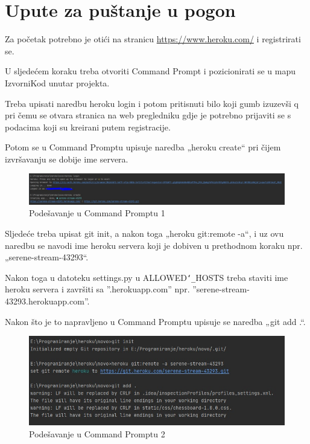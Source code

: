 			\eject
		
		\section{Upute za puštanje u pogon}
		
			\noindent Za početak potrebno je otići na stranicu \url{https://www.heroku.com/} i registrirati se. 
			
			\noindent U sljedećem koraku treba otvoriti Command Prompt i pozicionirati se u mapu IzvorniKod unutar projekta.
			
			\noindent Treba upisati naredbu heroku login i potom pritisnuti bilo koji gumb izuzevši q pri čemu se otvara stranica na web pregledniku gdje je potrebno prijaviti se s podacima koji su kreirani putem registracije.
			
			\noindent Potom se u Command Promptu upisuje naredba „heroku create“ pri čijem izvršavanju se dobije ime servera.
			
			\begin{figure}[H]
				\centerfloat
				\includegraphics[scale=0.3]{slike/pustanjeupogon1.jpeg} %
				\caption{Podešavanje u Command Promptu 1}
				
			\end{figure}
			
			\noindent Sljedeće treba upisat git init, a nakon toga „heroku git:remote -a“, i uz ovu naredbu se navodi ime heroku servera koji je dobiven u prethodnom koraku npr. „serene-stream-43293“.
			
			\noindent Nakon toga u datoteku settings.py u ALLOWED\texttt{\char`_}HOSTS treba staviti ime heroku servera i završiti sa ''.herokuapp.com'' npr. ''serene-stream-43293.herokuapp.com''. 
			
			\noindent Nakon što je to napravljeno u Command Promptu upisuje se naredba „git add .“.
			
			\begin{figure}[H]
				\centerfloat
				\includegraphics[scale=0.4]{slike/pustanjeupogon2.jpeg} %
				\caption{Podešavanje u Command Promptu 2}
				
			\end{figure}
			
